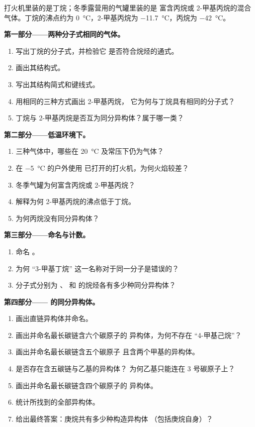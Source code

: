 \begin{problem}
\label{pb:g11:organic-skeletons:1}
打火机里装的是丁烷；冬季露营用的气罐里装的是
富含丙烷或 2-甲基丙烷的混合气体。丁烷的沸点约为
\qty{0}{\celsius}，2-甲基丙烷为 \qty{-11.7}{\celsius}，丙烷为
\qty{-42}{\celsius}。

\medskip
\noindent\textbf{第一部分——两种分子式相同的气体。}
\begin{enumerate}
  \item 写出丁烷的分子式，并检验它
        是否符合烷烃的通式。
  \item 画出其结构式。
  \item 写出其结构简式和键线式。
  \item 用相同的三种方式画出 2-甲基丙烷，
        它为何与丁烷具有相同的分子式？
  \item 丁烷与 2-甲基丙烷是否互为同分异构体？属于哪一类？
\end{enumerate}

\medskip
\noindent\textbf{第二部分——低温环境下。}
\begin{enumerate}[resume]
  \item 三种气体中，哪些在 \qty{20}{\celsius}
        及常压下仍为气体？
  \item 在 \qty{-5}{\celsius} 的户外使用
        已打开的打火机，为何火焰较差？
  \item 冬季气罐为何富含丙烷或 2-甲基丙烷？
  \item 解释为何 2-甲基丙烷的沸点低于丁烷。
  \item 为何丙烷没有同分异构体？
\end{enumerate}

\medskip
\noindent\textbf{第三部分——命名与计数。}
\begin{enumerate}[resume]
  \item 命名 。
  \item 为何 “3-甲基丁烷” 这一名称对于同一分子是错误的？
  \item 分子式分别为 、
         和  的烷烃各有多少种同分异构体？
\end{enumerate}

\medskip
\noindent\textbf{第四部分—— 的同分异构体。}
\begin{enumerate}[resume]
  \item 画出直链异构体并命名。
  \item 画出并命名最长碳链含六个碳原子的
        异构体，为何不存在 “4-甲基己烷”？
  \item 画出并命名最长碳链含五个碳原子
        且含两个甲基的异构体。
  \item 是否存在含五碳链与乙基的异构体？
        为何乙基只能连在 3 号碳原子上？
  \item 画出并命名最长碳链含四个碳原子的
        异构体。
  \item 统计所找到的全部异构体。
  \item 给出最终答案：庚烷共有多少种构造异构体
        （包括庚烷自身）？
\end{enumerate}
\end{problem}
